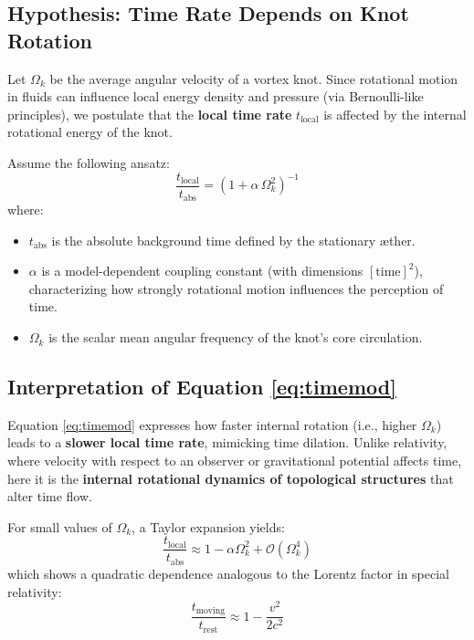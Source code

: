 \subsection{Hypothesis: Time Rate Depends on Knot Rotation}

Let $\Omega_k$ be the average angular velocity of a vortex knot. Since rotational motion in fluids can influence local energy density and pressure (via Bernoulli-like principles), we postulate that the \textbf{local time rate} $t_{\text{local}}$ is affected by the internal rotational energy of the knot.

Assume the following ansatz:
\begin{equation}
    \frac{t_{\text{local}}}{t_{\text{abs}}} = \left(1 + \alpha \, \Omega_k^2 \right)^{-1}
    \label{eq:timemod}
\end{equation}
where:
\begin{itemize}
    \item $t_{\text{abs}}$ is the absolute background time defined by the stationary æther.
    \item $\alpha$ is a model-dependent coupling constant (with dimensions $[\text{time}]^2$), characterizing how strongly rotational motion influences the perception of time.
    \item $\Omega_k$ is the scalar mean angular frequency of the knot's core circulation.
\end{itemize}

\subsection{Interpretation of Equation \ref{eq:timemod}}

Equation \ref{eq:timemod} expresses how faster internal rotation (i.e., higher $\Omega_k$) leads to a \textbf{slower local time rate}, mimicking time dilation. Unlike relativity, where velocity with respect to an observer or gravitational potential affects time, here it is the \textbf{internal rotational dynamics of topological structures} that alter time flow.

For small values of $\Omega_k$, a Taylor expansion yields:
\begin{equation}
    \frac{t_{\text{local}}}{t_{\text{abs}}} \approx 1 - \alpha \Omega_k^2 + \mathcal{O}(\Omega_k^4)
\end{equation}
which shows a quadratic dependence analogous to the Lorentz factor in special relativity:
\[
    \frac{t_{\text{moving}}}{t_{\text{rest}}} \approx 1 - \frac{v^2}{2c^2}
\]

